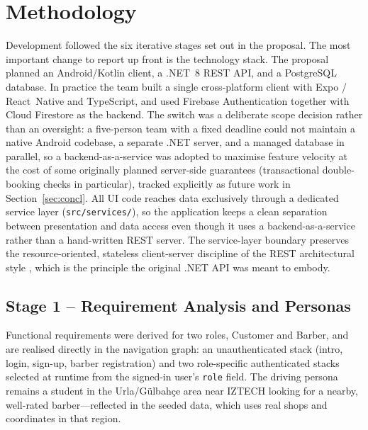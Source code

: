 \documentclass[14pt]{article}
\begin{document}
\section{Methodology}
\label{sec:method}
Development followed the six iterative stages set out in the proposal. The
most important change to report up front is the technology stack. The
proposal planned an Android/Kotlin client, a .NET~8 REST API, and a
PostgreSQL database. In practice the team built a single cross-platform
client with Expo / React~Native and TypeScript, and used Firebase
Authentication together with Cloud Firestore as the backend. The switch
was a deliberate scope decision rather than an oversight: a five-person
team with a fixed deadline could not maintain a native Android codebase,
a separate .NET server, and a managed database in parallel, so a
backend-as-a-service was adopted to maximise feature velocity at the
cost of some originally planned server-side guarantees (transactional
double-booking checks in particular), tracked explicitly as future
work in Section~\ref{sec:concl}. All UI code
reaches data exclusively through a dedicated service layer
(\texttt{src/services/}), so the application keeps a clean separation
between presentation and data access even though it uses a
backend-as-a-service rather than a hand-written REST server. The
service-layer boundary preserves the resource-oriented, stateless
client-server discipline of the REST architectural style
\citep{fielding2000rest}, which is the principle the original .NET
API was meant to embody.

\subsection{Stage 1 -- Requirement Analysis and Personas}
Functional requirements were derived for two roles, Customer and Barber,
and are realised directly in the navigation graph: an unauthenticated
stack (intro, login, sign-up, barber registration) and two role-specific
authenticated stacks selected at runtime from the signed-in user's
\texttt{role} field. The driving persona remains a student in the
Urla/G\"ulbah\c{c}e area near IZTECH looking for a nearby, well-rated
barber---reflected in the seeded data, which uses real shops and
coordinates in that region.
\end{document}

